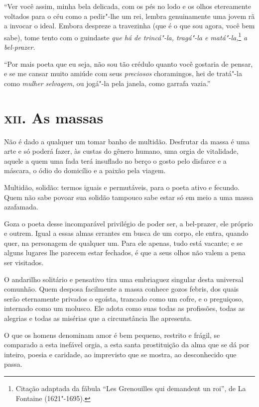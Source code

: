 “Ver você assim, minha bela delicada, com os pés no lodo e
os olhos etereamente voltados para o céu como a pedir"-lhe um rei,
lembra genuinamente uma jovem rã a invocar o ideal. Embora
despreze a travezinha (que é o que sou agora, você bem sabe), tome
tento com o guindaste \textit{que há de trincá"-la, tragá"-la e matá"-la,}\footnote{  Citação 
adaptada da fábula ``Les Grenouilles qui demandent un roi'', 
de La Fontaine (1621"-1695).}
\textit{a bel-prazer.}

“Por mais poeta que eu seja, não sou tão crédulo quanto
você gostaria de pensar, e se me cansar muito amiúde com seus \textit{preciosos}
choramingos, hei de tratá"-la como \textit{mulher selvagem}, ou jogá"-la pela
janela, como garrafa vazia.''

\chapter{\textsc{xii.} As massas}

Não é dado a qualquer um tomar banho de multidão. Desfrutar da massa é uma
arte e só poderá fazer, às custas do gênero humano, uma orgia de
vitalidade, aquele a quem uma fada terá insuflado no berço o gosto
pelo disfarce e a máscara, o ódio do domicílio e a paixão pela
viagem.

Multidão, solidão: termos iguais e permutáveis, para o poeta ativo e
fecundo. Quem não sabe povoar sua solidão tampouco sabe estar só em
meio a uma massa azafamada.

Goza o poeta desse incomparável privilégio de poder ser, a bel-prazer,
ele próprio e outrem. Igual a essas almas errantes em busca de um corpo,
ele entra, quando quer, na personagem de qualquer um. Para ele apenas, tudo
está vacante; e se alguns lugares lhe parecem estar fechados, é que a
seus olhos não valem a pena ser visitados.

O andarilho solitário e pensativo tira uma embriaguez singular desta
universal comunhão. Quem desposa facilmente a massa conhece gozos
febris, dos quais serão eternamente privados o egoísta, trancado como
um cofre, e o preguiçoso, internado como um molusco. Ele adota como
suas todas as profissões, todas as alegrias e todas as misérias que a
circunstância lhe apresenta.

O que os homens denominam amor é bem pequeno, restrito e frágil, se 
comparado a esta inefável orgia, a esta santa prostituição da alma
que se dá por inteiro, poesia e caridade, ao imprevisto que se mostra, ao
desconhecido que passa.


